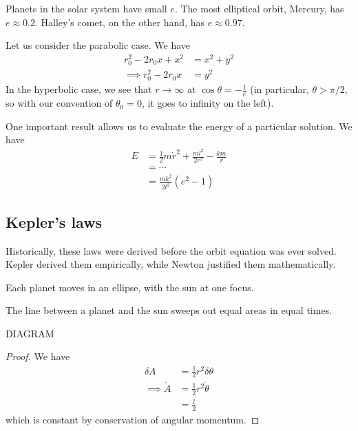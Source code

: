 \documentclass{../../template/note}
\begin{document}
    Planets in the solar system have small \(e\). The most elliptical orbit, Mercury, has \(e \approx 0.2\). Halley's comet, on the other hand, has \(e \approx 0.97\).

    Let us consider the parabolic case. We have
    \begin{align*}
        r_0^2 - 2r_0x + x^2 &= x^2 + y^2 \\
        \implies r_0^2 - 2r_0x &= y^2
    \end{align*}
    In the hyperbolic case, we see that \(r \to \infty\) at \(\cos \theta = -\frac 1 e\) (in particular, \(\theta > \pi/2\), so with our convention of \(\theta_0 = 0\), it goes to infinity on the left).

    One important result allows us to evaluate the energy of a particular solution. We have
    \begin{align*}
        E &= \frac 1 2 m \dot r^2 + \frac{ml^2}{2r^2} - \frac{km}r \\
        &= \cdots \\
        &= \frac{mk^2}{2l^2}(e^2-1)
    \end{align*}
    
    \subsection{Kepler's laws}
    
    Historically, these laws were derived before the orbit equation was ever solved. Kepler derived them empirically, while Newton justified them mathematically.

    \begin{proposition}
        Each planet moves in an ellipse, with the sun at one focus.
    \end{proposition}

    \begin{proposition}
        The line between a planet and the sun sweeps out equal areas in equal times.

        DIAGRAM
    \end{proposition}
    
    \begin{proof}
        We have
        \begin{align*}
            \delta A &= \frac 1 2 r^2 \delta \theta \\ 
            \implies \dot A &= \frac 1 2 r^2 \dot \theta \\
            &= \frac l 2
        \end{align*}
        which is constant by conservation of angular momentum.
    \end{proof}
    
\end{document}
